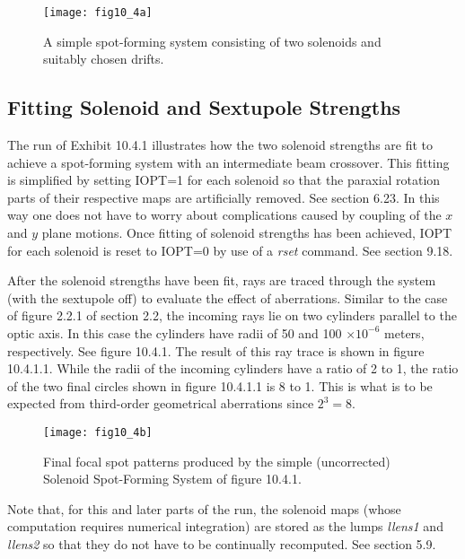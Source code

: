 \begin{figure}[htbp]
\renewcommand{\thefigure}{\thesection.\arabic{figure}}
  \centering
  \texttt{[image: fig10\_4a]}
  \caption{A simple spot-forming system consisting of two solenoids and
suitably chosen drifts.}
\end{figure}

\subsection{Fitting Solenoid and Sextupole Strengths}
\label{fitsole}
The \Mary run of Exhibit 10.4.1 illustrates how the two solenoid
strengths are fit to achieve a spot-forming system with an intermediate
beam crossover.  This fitting is simplified by setting IOPT=1 for each
solenoid so that the paraxial rotation parts of their respective maps are
artificially removed.  See section 6.23.  In this way one does not have to
worry about complications caused by coupling of the $x$ and $y$ plane
motions.  Once fitting of solenoid strengths has been achieved, IOPT for
each solenoid is reset to IOPT=0 by use of a {\em rset} command.  See
section 9.18.

After the solenoid strengths have been fit, rays are traced through the
system (with the sextupole off) to evaluate the effect of aberrations.
Similar to the case of figure 2.2.1 of section 2.2, the incoming rays lie
on two cylinders parallel to the optic axis.  In this case the cylinders
have radii of 50 and 100 $\times 10^{-6}$ meters, respectively.  See
figure 10.4.1.  The result of this ray trace is shown in figure 10.4.1.1.  While the radii of the incoming cylinders have a ratio of 2 to 1, the
ratio of the two final circles shown in figure 10.4.1.1 is 8 to 1.  This is
what is to be expected from third-order geometrical aberrations since
$2^3 = 8$.


\begin{figure}[htbp]
\setcounter{figure}{0}
  \centering
  \texttt{[image: fig10\_4b]}
  \caption{Final focal spot patterns produced by the simple (uncorrected)
Solenoid Spot-Forming System of figure 10.4.1.}
\end{figure}

Note that, for this and later parts of the run, the solenoid maps (whose
computation requires numerical integration) are stored as the lumps {\em
llens1} and {\em llens2} so that they do not have to be continually
recomputed.  See section 5.9.


